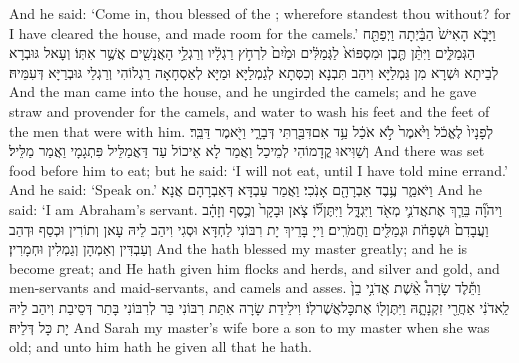 {And he said: ‘Come in, thou blessed of the \lord; wherefore standest thou without? for I have cleared the house, and made room for the camels.’}{}
{וַיָּבֹ֤א הָאִישׁ֙ הַבַּ֔יְתָה וַיְפַתַּ֖ח הַגְּמַלִּ֑ים וַיִּתֵּ֨ן תֶּ֤בֶן וּמִסְפּוֹא֙ לַגְּמַלִּ֔ים וּמַ֙יִם֙ לִרְחֹ֣ץ רַגְלָ֔יו וְרַגְלֵ֥י הָאֲנָשִׁ֖ים אֲשֶׁ֥ר אִתּֽוֹ׃}
{וְעָאל גּוּבְרָא לְבֵיתָא וּשְׁרָא מִן גַּמְלַיָּא וִיהַב תִּבְנָא וְכִסְּתָא לְגַמְלַיָּא וּמַיָּא לְאַסְחָאָה רַגְלוֹהִי וְרַגְלֵי גּוּבְרַיָּא דְּעִמֵּיהּ׃}
{And the man came into the house, and he ungirded the camels; and he gave straw and provender for the camels, and water to wash his feet and the feet of the men that were with him.}{}
{ לְפָנָיו֙ לֶאֱכֹ֔ל וַיֹּ֙אמֶר֙ לֹ֣א אֹכַ֔ל עַ֥ד אִם\maqqaf דִּבַּ֖רְתִּי דְּבָרָ֑י וַיֹּ֖אמֶר דַּבֵּֽר׃}
{וְשַׁוִּיאוּ קֳדָמוֹהִי לְמֵיכַל וַאֲמַר לָא אֵיכוֹל עַד דַּאֲמַלֵּיל פִּתְגָמָי וַאֲמַר מַלֵּיל׃}
{And there was set food before him to eat; but he said: ‘I will not eat, until I have told mine errand.’ And he said: ‘Speak on.’}{}
{וַיֹּאמַ֑ר עֶ֥בֶד אַבְרָהָ֖ם אָנֹֽכִי׃}
{וַאֲמַר עַבְדָּא דְּאַבְרָהָם אֲנָא׃}
{And he said: ‘I am Abraham’s servant.}{}
{וַיהֹוָ֞ה בֵּרַ֧ךְ אֶת\maqqaf אֲדֹנִ֛י מְאֹ֖ד וַיִּגְדָּ֑ל וַיִּתֶּן\maqqaf ל֞וֹ צֹ֤אן וּבָקָר֙ וְכֶ֣סֶף וְזָהָ֔ב וַעֲבָדִם֙ וּשְׁפָחֹ֔ת וּגְמַלִּ֖ים וַחֲמֹרִֽים׃}
{וַייָ בָּרֵיךְ יָת רִבּוֹנִי לַחְדָּא וּסְגִי וִיהַב לֵיהּ עָאן וְתוֹרִין וּכְסַף וּדְהַב וְעַבְדִּין וְאַמְהָן וְגַמְלִין וּחְמָרִין׃}
{And the \lord\space hath blessed my master greatly; and he is become great; and He hath given him flocks and herds, and silver and gold, and men-servants and maid-servants, and camels and asses.}{}
{וַתֵּ֡לֶד שָׂרָה֩ אֵ֨שֶׁת אֲדֹנִ֥י בֵן֙ לַֽאדֹנִ֔י אַחֲרֵ֖י זִקְנָתָ֑הּ וַיִּתֶּן\maqqaf ל֖וֹ אֶת\maqqaf כׇּל\maqqaf אֲשֶׁר\maqqaf לֽוֹ׃}
{וִילֵידַת שָׂרָה אִתַּת רִבּוֹנִי בַּר לְרִבּוֹנִי בָּתַר דְּסֵיבַת וִיהַב לֵיהּ יָת כָּל דְּלֵיהּ׃}
{And Sarah my master’s wife bore a son to my master when she was old; and unto him hath he given all that he hath.}{}
